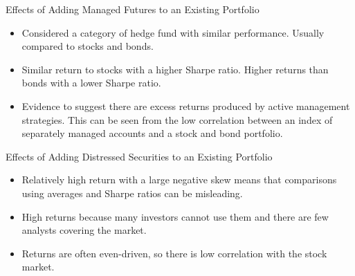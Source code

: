 \documentclass[../custom]{flashcards}
\begin{document}
\begin{flashcard}{Effects of Adding Managed Futures to an Existing Portfolio}
    \begin{itemize}
        \item Considered a category of hedge fund with similar performance. Usually compared to stocks and bonds.
        \item Similar return to stocks with a higher Sharpe ratio. Higher returns than bonds with a lower Sharpe ratio.
        \item Evidence to suggest there are excess returns produced by active management strategies. This can be seen from the low correlation between an index of separately managed accounts and a stock and bond portfolio.
    \end{itemize}
\end{flashcard}

\begin{flashcard}{Effects of Adding Distressed Securities to an Existing Portfolio}
    \begin{itemize}
        \item Relatively high return with a large negative skew means that comparisons using averages and Sharpe ratios can be misleading.
        \item High returns because many investors cannot use them and there are few analysts covering the market.
        \item Returns are often even-driven, so there is low correlation with the stock market.
    \end{itemize}
\end{flashcard}
\end{document}
